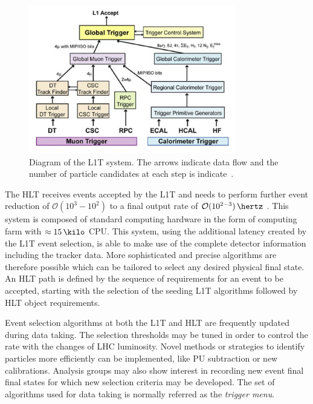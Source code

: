 \begin{figure}[!htb]
  \centering
  \includegraphics[width=0.80\textwidth]{Chapter02/CMS/Images/CMS_L1T_Layout.png}
  \caption{Diagram of the \gls{L1T} system. The arrows indicate data flow and the number of particle candidates at each step is indicate~\cite{ARTICLE:TheCMSExperiment}.}
  \label{FIGURE:ExperimentalApparatus_CMS_L1T_Layout}
\end{figure}

The \gls{HLT} receives events accepted by the \gls{L1T} and needs to perform further event reduction of 
$\mathcal{O}(10^{3}-10^{2})$ to a final output rate of $\mathcal{O}(10^{2-3})\,\hertz$ . This system is composed of standard computing hardware in the form of computing farm with $\approx 15\,\kilo$ \gls{CPU}. This system, using the additional latency created by the \gls{L1T} event selection, is able to make use of the complete detector information including the tracker data. More sophisticated and precise algorithms are therefore possible which can be tailored to select any desired physical final state. An \gls{HLT} path is defined by the sequence of requirements for an event to be accepted, starting with the selection of the seeding \gls{L1T} algorithms followed by \gls{HLT} object requirements.

Event selection algorithms at both the \gls{L1T} and \gls{HLT} are frequently updated during data taking. The selection thresholds may be tuned in order to control the rate with the changes of \gls{LHC} luminosity. Novel methods or strategies to identify particles more efficiently can be implemented, like \gls{PU} subtraction or new calibrations. Analysis groups may also show interest in recording new event final final states for which new selection criteria may be developed. The set of algorithms used for data taking is normally referred as the \textit{trigger menu}. 

